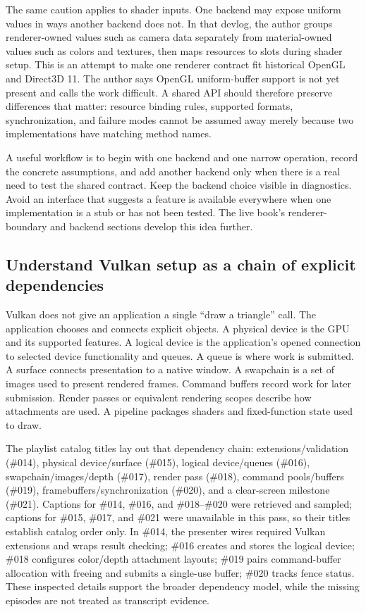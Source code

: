 The same caution applies to shader inputs. One backend may expose uniform values in ways another backend does not. In that devlog, the author groups renderer-owned values such as camera data separately from material-owned values such as colors and textures, then maps resources to slots during shader setup. This is an attempt to make one renderer contract fit historical OpenGL and Direct3D 11. The author says OpenGL uniform-buffer support is not yet present and calls the work difficult. A shared API should therefore preserve differences that matter: resource binding rules, supported formats, synchronization, and failure modes cannot be assumed away merely because two implementations have matching method names.

A useful workflow is to begin with one backend and one narrow operation, record the concrete assumptions, and add another backend only when there is a real need to test the shared contract. Keep the backend choice visible in diagnostics. Avoid an interface that suggests a feature is available everywhere when one implementation is a stub or has not been tested. The live book's renderer-boundary and backend sections develop this idea further.

\subsection{Understand Vulkan setup as a chain of explicit dependencies}\label{06-engine-ii-ch025-understand-vulkan-setup-as-a-chain-of-explicit-dependencies}

Vulkan does not give an application a single ``draw a triangle'' call. The application chooses and connects explicit objects. A physical device is the GPU and its supported features. A logical device is the application's opened connection to selected device functionality and queues. A queue is where work is submitted. A surface connects presentation to a native window. A swapchain is a set of images used to present rendered frames. Command buffers record work for later submission. Render passes or equivalent rendering scopes describe how attachments are used. A pipeline packages shaders and fixed-function state used to draw.

The playlist catalog titles lay out that dependency chain: extensions/validation (\#014), physical device/surface (\#015), logical device/queues (\#016), swapchain/images/depth (\#017), render pass (\#018), command pools/buffers (\#019), framebuffers/synchronization (\#020), and a clear-screen milestone (\#021). Captions for \#014, \#016, and \#018--\#020 were retrieved and sampled; captions for \#015, \#017, and \#021 were unavailable in this pass, so their titles establish catalog order only. In \#014, the presenter wires required Vulkan extensions and wraps result checking; \#016 creates and stores the logical device; \#018 configures color/depth attachment layouts; \#019 pairs command-buffer allocation with freeing and submits a single-use buffer; \#020 tracks fence status. These inspected details support the broader dependency model, while the missing episodes are not treated as transcript evidence.

